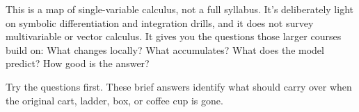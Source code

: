 This is a map of single-variable calculus, not a full syllabus. It's deliberately light on symbolic differentiation and integration drills, and it does not survey multivariable or vector calculus. It gives you the questions those larger courses build on: What changes locally? What accumulates? What does the model predict? How good is the answer?


\clearpage{}
\vspace{4pt}
\vspace{4pt}
Try the questions first. These brief answers identify what should carry over when the original cart, ladder, box, or coffee cup is gone.

